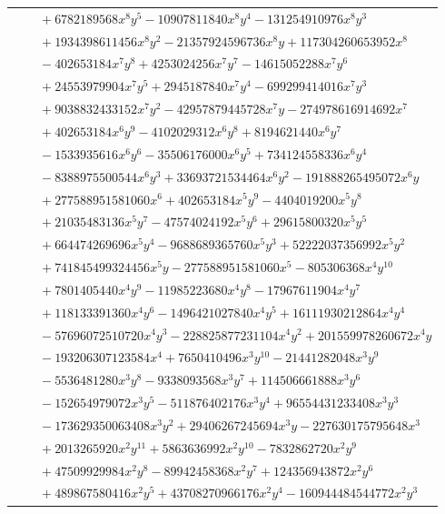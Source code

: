\documentclass[11pt]{article}
\begin{document}
\begin{longtable}{@{}ll@{}}
 & $\quad +6782189568x^{8}y^{5}-10907811840x^{8}y^{4}-131254910976x^{8}y^{3}$\\
 & $\quad +1934398611456x^{8}y^{2}-21357924596736x^{8}y+117304260653952x^{8}$\\
 & $\quad -402653184x^{7}y^{8}+4253024256x^{7}y^{7}-14615052288x^{7}y^{6}$\\
 & $\quad +24553979904x^{7}y^{5}+2945187840x^{7}y^{4}-699299414016x^{7}y^{3}$\\
 & $\quad +9038832433152x^{7}y^{2}-42957879445728x^{7}y-274978616914692x^{7}$\\
 & $\quad +402653184x^{6}y^{9}-4102029312x^{6}y^{8}+8194621440x^{6}y^{7}$\\
 & $\quad -1533935616x^{6}y^{6}-35506176000x^{6}y^{5}+734124558336x^{6}y^{4}$\\
 & $\quad -8388975500544x^{6}y^{3}+33693721534464x^{6}y^{2}-191888265495072x^{6}y$\\
 & $\quad +277588951581060x^{6}+402653184x^{5}y^{9}-4404019200x^{5}y^{8}$\\
 & $\quad +21035483136x^{5}y^{7}-47574024192x^{5}y^{6}+29615800320x^{5}y^{5}$\\
 & $\quad +664474269696x^{5}y^{4}-9688689365760x^{5}y^{3}+52222037356992x^{5}y^{2}$\\
 & $\quad +741845499324456x^{5}y-277588951581060x^{5}-805306368x^{4}y^{10}$\\
 & $\quad +7801405440x^{4}y^{9}-11985223680x^{4}y^{8}-17967611904x^{4}y^{7}$\\
 & $\quad +118133391360x^{4}y^{6}-1496421027840x^{4}y^{5}+16111930212864x^{4}y^{4}$\\
 & $\quad -57696072510720x^{4}y^{3}-228825877231104x^{4}y^{2}+201559978260672x^{4}y$\\
 & $\quad -193206307123584x^{4}+7650410496x^{3}y^{10}-21441282048x^{3}y^{9}$\\
 & $\quad -5536481280x^{3}y^{8}-9338093568x^{3}y^{7}+114506661888x^{3}y^{6}$\\
 & $\quad -152654979072x^{3}y^{5}-511876402176x^{3}y^{4}+96554431233408x^{3}y^{3}$\\
 & $\quad -173629350063408x^{3}y^{2}+29406267245694x^{3}y-227630175795648x^{3}$\\
 & $\quad +2013265920x^{2}y^{11}+5863636992x^{2}y^{10}-7832862720x^{2}y^{9}$\\
 & $\quad +47509929984x^{2}y^{8}-89942458368x^{2}y^{7}+124356943872x^{2}y^{6}$\\
 & $\quad +489867580416x^{2}y^{5}+43708270966176x^{2}y^{4}-160944484544772x^{2}y^{3}$\\

\end{longtable}
\end{document}
